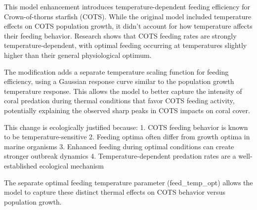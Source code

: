 This model enhancement introduces temperature-dependent feeding efficiency for Crown-of-thorns starfish (COTS). While the original model included temperature effects on COTS population growth, it didn't account for how temperature affects their feeding behavior. Research shows that COTS feeding rates are strongly temperature-dependent, with optimal feeding occurring at temperatures slightly higher than their general physiological optimum.

The modification adds a separate temperature scaling function for feeding efficiency, using a Gaussian response curve similar to the population growth temperature response. This allows the model to better capture the intensity of coral predation during thermal conditions that favor COTS feeding activity, potentially explaining the observed sharp peaks in COTS impacts on coral cover.

This change is ecologically justified because:
1. COTS feeding behavior is known to be temperature-sensitive
2. Feeding optima often differ from growth optima in marine organisms
3. Enhanced feeding during optimal conditions can create stronger outbreak dynamics
4. Temperature-dependent predation rates are a well-established ecological mechanism

The separate optimal feeding temperature parameter (feed_temp_opt) allows the model to capture these distinct thermal effects on COTS behavior versus population growth.
